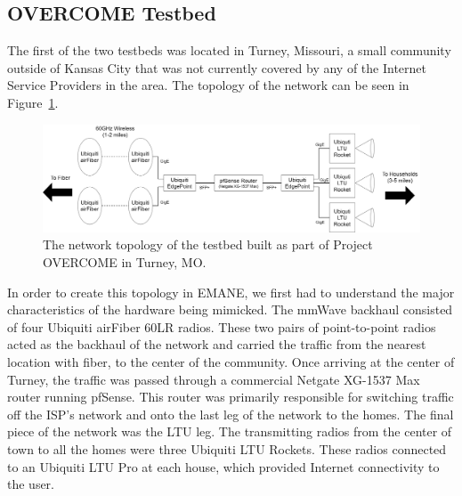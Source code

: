 \subsection{OVERCOME Testbed}
The first of the two testbeds was located in Turney, Missouri, a small community outside of Kansas City that was not currently covered by any of the Internet Service Providers in the area.
The topology of the network can be seen in Figure~\ref{overcome_topology}.
\begin{figure}[!ht]
    \centering
    \includegraphics[width=\textwidth,keepaspectratio]{Images/Chpt3/OVERCOME_Topology.png}
    \caption{The network topology of the testbed built as part of Project OVERCOME in Turney, MO.}
    \label{overcome_topology}
\end{figure}
In order to create this topology in EMANE, we first had to understand the major characteristics of the hardware being mimicked.
The mmWave backhaul consisted of four Ubiquiti airFiber 60LR radios.
These two pairs of point-to-point radios acted as the backhaul of the network and carried the traffic from the nearest location with fiber, to the center of the community.
Once arriving at the center of Turney, the traffic was passed through a commercial Netgate XG-1537 Max router running pfSense.
This router was primarily responsible for switching traffic off the ISP's network and onto the last leg of the network to the homes.
The final piece of the network was the LTU leg.
The transmitting radios from the center of town to all the homes were three Ubiquiti LTU Rockets.
These radios connected to an Ubiquiti LTU Pro at each house, which provided Internet connectivity to the user. 

